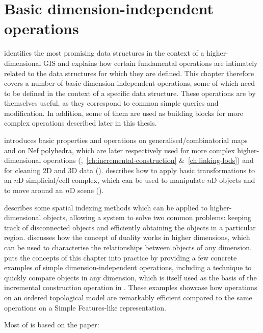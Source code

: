 
\chapter{Basic dimension-independent operations}
\label{ch:operations-background}

 identifies the most promising data structures in the context of a higher-dimensional GIS
and explains how certain fundamental operations are intimately related to the data structures for which they are defined.
This chapter therefore covers a number of basic dimension-independent operations, some of which need to be defined in the context of a specific data structure.
These operations are by themselves useful, as they correspond to common simple queries and modification.
In addition, some of them are used as building blocks for more complex operations described later in this thesis.

 introduces basic properties and operations on generalised/combinatorial maps and on Nef polyhedra, which are later respectively used for more complex higher-dimensional operations (,~\ref{ch:incremental-construction} \&~\ref{ch:linking-lods}) and for cleaning 2D and 3D data ().
 describes how to apply basic transformations to an $n$D simplicial/cell complex, which can be used to manipulate $n$D objects and to move around an $n$D scene ().

 describes some spatial indexing methods which can be applied to higher-dimensional objects, allowing a system to solve two common problems: keeping track of disconnected objects and efficiently obtaining the objects in a particular region.
 discusses how the concept of duality works in higher dimensions, which can be used to characterise the relationships between objects of any dimension.
 puts the concepts of this chapter into practice by providing a few concrete examples of simple dimension-independent operations, including a technique to quickly compare objects in any dimension, which is itself used as the basis of the incremental construction operation in .
These examples showcase how operations on an ordered topological model are remarkably efficient compared to the same operations on a Simple Features-like representation.

Most of  is based on the paper:
\begin{itemize}
\papergeoadvancesnd%
\end{itemize}

